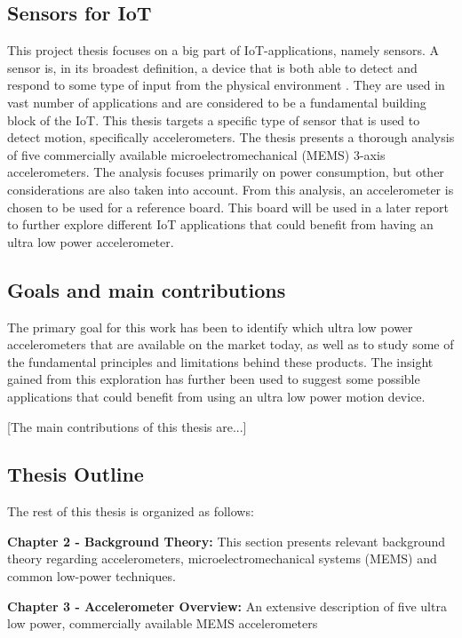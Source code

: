 \subsection{Sensors for IoT}

This project thesis focuses on a big part of IoT-applications, namely sensors. A sensor is, in its broadest definition, a device that is both able to detect and respond to some type of input from the physical environment \cite{wigmore12}. They are used in vast number of applications and are considered to be a fundamental building block of the IoT. This thesis targets a specific type of sensor that is used to detect motion, specifically accelerometers. The thesis presents a thorough analysis of five commercially available microelectromechanical (MEMS) 3-axis accelerometers. The analysis focuses primarily on power consumption, but other considerations are also taken into account. From this analysis, an accelerometer is chosen to be used for a reference board. This board will be used in a later report to further explore different IoT applications that could benefit from having an ultra low power accelerometer.

\newpage

\subsection{Goals and main contributions}

The primary goal for this work has been to identify which ultra low power accelerometers that are available on the market today, as well as to study some of the fundamental principles and limitations behind these products. The insight gained from this exploration has further been used to suggest some possible applications that could benefit from using an ultra low power motion device.  

[The main contributions of this thesis are...] 

\subsection{Thesis Outline}

The rest of this thesis is organized as follows:

\textbf{Chapter 2 - Background Theory:} This section presents relevant background theory regarding accelerometers, microelectromechanical systems (MEMS) and common low-power techniques.  

\textbf{Chapter 3 - Accelerometer Overview:} An extensive description of five ultra low power, commercially available MEMS accelerometers

